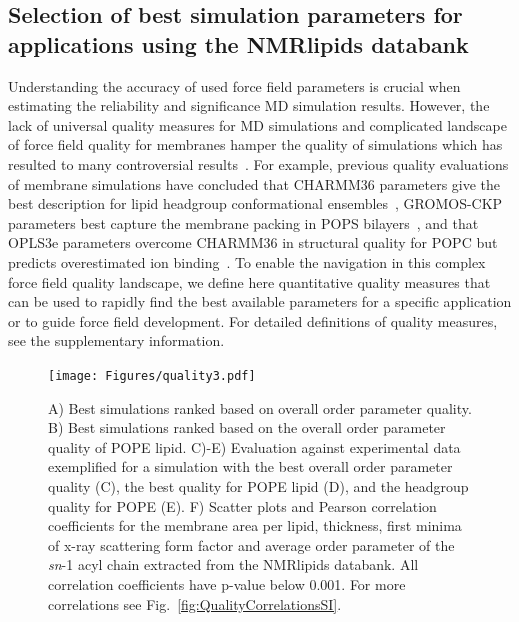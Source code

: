 \documentclass[fleqn,10pt]{wlscirep}
\begin{document}
\subsection{Selection of best simulation parameters for applications using the NMRlipids databank}
Understanding the accuracy of used force field parameters is crucial when estimating the reliability and significance MD simulation results. However, the lack of universal quality measures for MD simulations and complicated landscape of force field quality for membranes hamper the quality of simulations which has resulted to many controversial results~\cite{antila22b}. For example, previous quality evaluations of membrane simulations have concluded that CHARMM36 parameters give the best description for lipid headgroup conformational ensembles~\cite{bacle21}, GROMOS-CKP parameters best capture the membrane packing in POPS bilayers~\cite{antila22b}, and that OPLS3e parameters overcome CHARMM36 in structural quality for POPC but predicts overestimated ion binding~\cite{kurki22}. 
To enable the navigation in this complex force field quality landscape, we define here quantitative quality measures that can be used to rapidly find the best available parameters for a specific application or to guide force field development. For detailed definitions of quality measures, see the supplementary information.

\begin{figure}[!t]
    \centering
    \texttt{[image: Figures/quality3.pdf]}
    \caption{ A) Best simulations ranked based on overall order parameter quality.
    B) Best simulations ranked based on the overall order parameter quality of POPE lipid. 
    C)-E) Evaluation against experimental data exemplified for a simulation with the best overall order parameter quality (C), the best quality for POPE lipid (D), and the headgroup quality for POPE (E).
    F) Scatter plots and Pearson correlation coefficients for the membrane area per lipid, thickness, first minima of x-ray scattering form factor and average order parameter of the {\it sn}-1 acyl chain extracted from the NMRlipids databank. 
    All correlation coefficients have p-value below 0.001. For more correlations see Fig.~\ref{fig:QualityCorrelationsSI}.
    }
    \label{fig:quality}
\end{figure}
\end{document}
